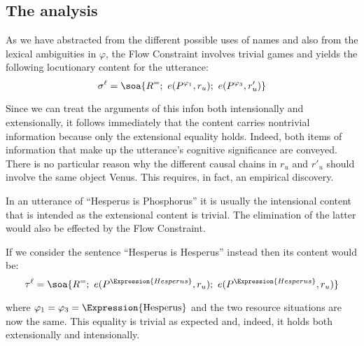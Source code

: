 %
%
%
%

\subsection{The analysis}
As we have abstracted from the different possible uses of names and also from the lexical ambiguities in $\varphi$, the Flow Constraint involves trivial games and yields the following locutionary content for the utterance: \[ \sigma^{\ell} = \soa{R^{=};\ e(P^{\varphi_1},r_u);\ e(P^{\varphi_3},r'_u)} \]

Since we can treat the arguments of this infon both intensionally and extensionally, it follows immediately that the content carries nontrivial information because only the extensional equality holds. Indeed, both items of information that make up the utterance's cognitive significance are conveyed. There is no particular reason why the different causal chains in $r_u$ and $r'_u$ should involve the same object Venus. This requires, in fact, an empirical discovery. 

In an utterance of ``Hesperus is Phosphorus'' it is usually the intensional content that is intended as the extensional content is trivial. The elimination of the latter would also be effected by the Flow Constraint.

If we consider the sentence ``Hesperus is Hesperus'' instead then its content would be: \[ \tau^{\ell} = \soa{R^{=};\ e(P^{\Expression{Hesperus}},r_u);\ e(P^{\Expression{Hesperus}},r_u)} \]

\noindent where $\varphi_1 = \varphi_3 = \hbox{\Expression{Hesperus}}$ and the two resource situations are now the same. This equality is trivial as expected and, indeed, it holds both extensionally and intensionally. 


